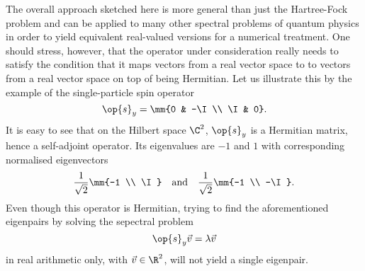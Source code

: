 The overall approach sketched here
is more general than just the Hartree-Fock problem
and can be applied to many other spectral problems of quantum physics
in order to yield equivalent real-valued versions for a numerical treatment.
One should stress, however,
that the operator under consideration really needs to satisfy
the condition that it maps vectors from a real vector space
to to vectors from a real vector space
on top of being Hermitian.
Let us illustrate this by the example of the single-particle spin operator
\[ \op{s}_y = \mm{0 & -\I \\ \I & 0}. \]
It is easy to see that on the Hilbert space $\C^2$,
$\op{s}_y$ is a Hermitian matrix, hence a self-adjoint operator.
Its eigenvalues are $-1$ and $1$ with corresponding normalised eigenvectors
\[ \frac{1}{\sqrt{2}} \mm{-1 \\ \I} \quad \text{and} \quad
  \frac{1}{\sqrt{2}} \mm{-1 \\ -\I}.
\]
Even though this operator is Hermitian,
trying to find the aforementioned eigenpairs by solving the sepectral problem
\[ \op{s}_y \vec{v} = \lambda \vec{v} \]
in real arithmetic only, \ie with $\vec{v} \in \R^2$,
will not yield a single eigenpair.
